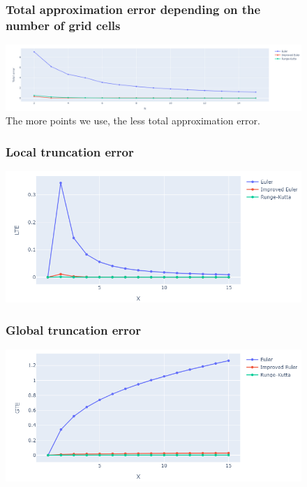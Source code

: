 \documentclass[12pt,letterpaper]{article}
\begin{document}
\begin{figure}[!h]
    \begin{center}
        \subsubsection*{Total approximation error depending on the number of grid cells}
    \end{center}
    \centering
        \includegraphics[width=1\linewidth]{total.png}
    \centering The more points we use, the less total
approximation error.

\end{figure}

\begin{figure}[!h]
    \begin{center}
        \subsubsection*{Local truncation error}
    \end{center}
    \centering
        \includegraphics[width=0.8\linewidth]{lte.png}
\end{figure}



\begin{figure}[!h]
    \begin{center}
        \subsubsection*{Global truncation error}
    \end{center}
    \centering
        \includegraphics[width=0.8\linewidth]{gte.png}
\end{figure}
\end{document}
